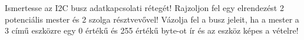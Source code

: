 \begin{example}

Ismertesse az I2C busz adatkapcsolati rétegét! Rajzoljon fel egy elrendezést 2 potenciális mester és 2 szolga résztvevővel! Vázolja fel a busz jeleit, ha a mester a 3 című eszközre egy 0 értékű és 255 értékű byte-ot ír és az eszköz képes a vételre!


\tcbline
\vspace{1mm}

\solution

\end{example}